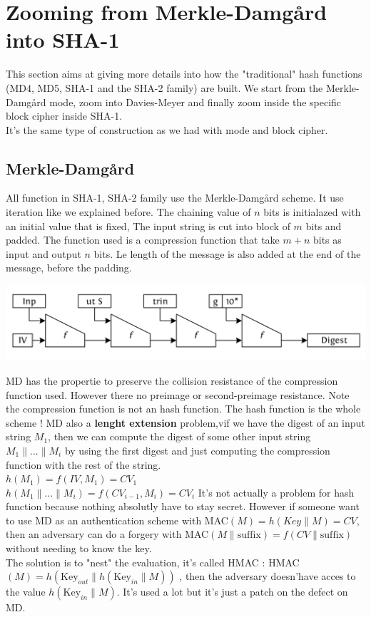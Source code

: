 \documentclass[11pt,a4paper]{report}
\begin{document}
\section{Zooming from Merkle-Damgård into SHA-1}
This section aims at giving more details into how the "traditional" hash functions (MD4, MD5, SHA-1 and the SHA-2 family) are built. We start from the Merkle-Damgård mode, zoom into Davies-Meyer and finally zoom inside the specific block cipher inside SHA-1.\\
It's the same type of construction as we had with mode and block cipher.

\subsection{Merkle-Damgård}
All function in SHA-1, SHA-2 family use the Merkle-Damgård scheme. It use iteration like we explained before. The chaining value of $n$ bits is initialazed with an initial value that is fixed, The input string is cut into block of $m$ bits and padded. The function used is a compression function that take $m + n$ bits as input and output $n$ bits. Le length of the message is also added at the end of the message, before the padding.
\begin{center}
\includegraphics[scale=0.5]{img/img21.png}
\end{center}
MD has the propertie to preserve the collision resistance of the compression function used. However there no preimage or second-preimage resistance.
Note the compression function is not an hash function. The hash function is the whole scheme !
MD also a \textbf{lenght extension} problem,vif we have the digest of an input string $M_1$, then we can compute the digest of some other input string $M_1\parallel ... \parallel M_i$ by using the first digest and just computing the compression function with the rest of the string. \\
$h(M_1) = f(IV,M_1) = CV_1$\\
$h(M_1\parallel ... \parallel M_i) = f(CV_{i-1},M_i) = CV_i$
It's not actually a problem for hash function because nothing absolutly have to stay secret. However if someone want to use MD as an authentication scheme with MAC$(M) = h(Key\parallel M) = CV$, then an adversary can do a forgery with MAC$(M\parallel \text{suffix}) = f(CV\parallel \text{suffix})$ without needing to know the key.\\
The solution is to "nest" the evaluation, it's called HMAC : HMAC$(M) = h(\text{Key}_{out} \parallel h(\text{Key}_{in} \parallel M))$ , then the adversary doesn'have acces to the value $h(\text{Key}_{in}\parallel M )$. It's used a lot but it's just a patch on the defect on MD.
\end{document}

